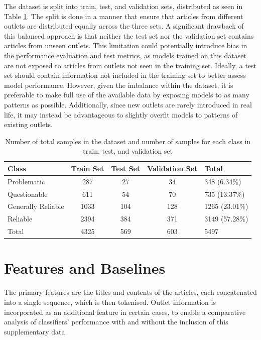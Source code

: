 The dataset is split into train, test, and validation sets, distributed as seen in Table \ref{table:dataset_split}. The split is done in a manner that ensure that articles from different outlets are distributed equally across the three sets. A significant drawback of this balanced approach is that neither the test set nor the validation set contains articles from unseen outlets. This limitation could potentially introduce bias in the performance evaluation and test metrics, as models trained on this dataset are not exposed to articles from outlets not seen in the training set. Ideally, a test set should contain information not included in the training set to better assess model performance. However, given the imbalance within the dataset, it is preferable to make full use of the available data by exposing models to as many patterns as possible. Additionally, since new outlets are rarely introduced in real life, it may instead be advantageous to slightly overfit models to patterns of existing outlets.

\begin{table}[htbp]
    \centering
    \begin{tabular}{| l | c | c | c | l |}
        \hline
        Class              & Train Set & Test Set & Validation Set & Total           \\
        \hline
        Problematic        & 287       & 27       & 34             & 348   (6.34\%)  \\
        Questionable       & 611       & 54       & 70             & 735   (13.37\%) \\
        Generally Reliable & 1033      & 104      & 128            & 1265  (23.01\%) \\
        Reliable           & 2394      & 384      & 371            & 3149  (57.28\%) \\
        \hline
        Total              & 4325      & 569      & 603            & 5497            \\
        \hline
    \end{tabular}
    \caption{Number of total samples in the dataset and number of samples for each class in train, test, and validation set}
    \label{table:dataset_split}
\end{table}


\section{Features and Baselines}

The primary features are the titles and contents of the articles, each concatenated into a single sequence, which is then tokenised.  Outlet information is incorporated as an additional feature in certain cases, to enable a comparative analysis of classifiers' performance with and without the inclusion of this supplementary data.

